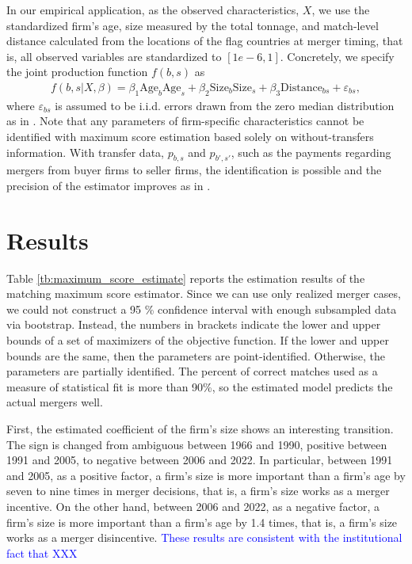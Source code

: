 \documentclass[10pt]{article}
\begin{document}
In our empirical application, as the observed characteristics, $X$, we use the standardized firm's age, size measured by the total tonnage, and match-level distance calculated from the locations of the flag countries at merger timing, that is, all observed variables are standardized to $[1e-6,1]$. 
Concretely, we specify the joint production function $f(b,s)$ as
\begin{align}
    f(b,s|X,\beta)= \beta_1 \text{Age}_{b}\text{Age}_{s} + \beta_2 \text{Size}_{b}\text{Size}_{s} + \beta_3 \text{Distance}_{bs} + \varepsilon_{bs},\label{eq:joint_production}
\end{align}
where $\varepsilon_{bs}$ is assumed to be i.i.d. errors drawn from the zero median distribution as in \cite{fox2018qe}. 
Note that any parameters of firm-specific characteristics cannot be identified with maximum score estimation based solely on without-transfers information. With transfer data, $p_{b,s}$ and $p_{b',s'}$, such as the payments regarding mergers from buyer firms to seller firms, the identification is possible and the precision of the estimator improves as in \cite{akkus2015ms}.


\section{Results}\label{sec:results}

Table \ref{tb:maximum_score_estimate} reports the estimation results of the matching maximum score estimator. 
Since we can use only realized merger cases, we could not construct a 95 \% confidence interval with enough subsampled data via bootstrap.
Instead, the numbers in brackets indicate the lower and upper bounds of a set of maximizers of the objective function. 
If the lower and upper bounds are the same, then the parameters are point-identified. 
Otherwise, the parameters are partially identified.
The percent of correct matches used as a measure of statistical fit is more than 90\%, so the estimated model predicts the actual mergers well.

First, the estimated coefficient of the firm's size shows an interesting transition. 
The sign is changed from ambiguous between 1966 and 1990, positive between 1991 and 2005, to negative between 2006 and 2022. 
In particular, between 1991 and 2005, as a positive factor, a firm's size is more important than a firm's age by seven to nine times in merger decisions, that is, a firm's size works as a merger incentive.
On the other hand, between 2006 and 2022, as a negative factor, a firm's size is more important than a firm's age by 1.4 times, that is, a firm's size works as a merger disincentive.
\textcolor{blue}{These results are consistent with the institutional fact that XXX}
\end{document}
